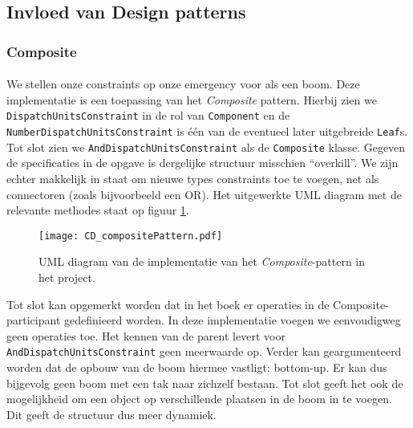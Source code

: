 \subsection{Invloed van Design patterns}
\label{designpatterns}
\subsubsection{Composite}
\paragraph{}
We stellen onze constraints op onze emergency voor als een boom. Deze implementatie is een toepassing van het \textit{Composite} pattern. Hierbij zien we \texttt{Dispatch\-Units\-Constraint} in de rol van \texttt{Component} en de \texttt{Number\-Dispatch\-Units\-Constraint} is \'e\'en van de eventueel later uitgebreide \texttt{Leaf}s. Tot slot zien we \texttt{And\-Dispatch\-Units\-Constraint} als de \texttt{Composite} klasse. Gegeven de specificaties in de opgave is dergelijke structuur misschien ``overkill''. We zijn echter makkelijk in staat om nieuwe types constraints toe te voegen, net als connectoren (zoals bijvoorbeeld een OR). Het uitgewerkte UML diagram met de relevante methodes staat op figuur \ref{fig:compositePattern}.
\begin{figure}[h!]
\texttt{[image: CD\_compositePattern.pdf]}
\caption{UML diagram van de implementatie van het \textit{Composite}-pattern in het project.}
\label{fig:compositePattern}
\end{figure}
Tot slot kan opgemerkt worden dat in het boek er operaties in de Composite-participant gedefinieerd worden. In deze implementatie voegen we eenvoudigweg geen operaties toe. Het kennen van de parent levert voor \verb+AndDispatchUnitsConstraint+ geen meerwaarde op. Verder kan geargumenteerd worden dat de opbouw van de boom hiermee vastligt: bottom-up. Er kan dus bijgevolg geen boom met een tak naar zichzelf bestaan. Tot slot geeft het ook de mogelijkheid om een object op verschillende plaatsen in de boom in te voegen. Dit geeft de structuur dus meer dynamiek.
